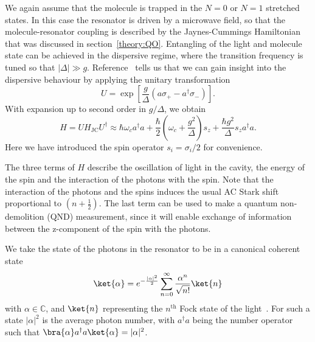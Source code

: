 We again assume that the molecule is trapped in the $N=0$ or $N=1$ stretched
states. In this case the resonator is driven by a microwave field, so that the
molecule-resonator coupling is described by the Jaynes-Cummings
Hamiltonian that was discussed in section~\ref{theory:QO}.
%
Entangling of the light and molecule state can be achieved in the dispersive
regime, where the transition frequency is tuned so that $|\Delta|\gg g$.
Reference~\cite{PhysRevA.69.062320} tells us that we can gain insight into the
dispersive behaviour by applying the unitary transformation
%
\begin{equation}
  U = \exp \left[\frac{g}{\Delta}(a\sigma_+ - a^\dagger\sigma_-)\right].
  \label{mws:eqn:Utransform}
\end{equation}
%
With expansion up to second order in $g/\Delta$, we obtain
%
\begin{equation} H= UH_\text{JC}U^\dagger \approx \hbar \omega_c
  a^\dagger a + \frac{\hbar}{2}\left(\omega_c +
  \frac{g^2}{\Delta}\right)s_z + \frac{\hbar
  g^2}{\Delta}s_z a^\dagger a.
  \label{mws:eqn:UHU}
\end{equation}
%
Here we have introduced the spin operator $s_i = \sigma_i/2$ for convenience.

The three terms of $H$ describe the oscillation of light in the cavity, the
energy of the spin and the interaction of the photons with the spin. Note that
the interaction of the photons and the spins induces the usual AC Stark shift
proportional to $(n+\frac{1}{2})$. The last term can be used to make a quantum
non-demolition (QND) measurement, since it will enable exchange of information
between the z-component of the spin with the photons.

We take the state of the photons in the resonator to be in a canonical coherent
state~\cite{Gazeau2009}
%
\begin{equation}
  \ket{\alpha} = e^{-\frac{|\alpha|^2}{2}}\sum_{n=0}^\infty \frac{\alpha^n}{\sqrt{n!}} \ket{n}
  \label{mws:eqn:coherent}
\end{equation}
%
with $\alpha\in\mathbb{C}$, and $\ket{n}$ representing the $n^\text{th}$
Fock state of the light~\cite{agarwal2012}. For such a state $|\alpha|^2$ is
the average photon number, with $a^\dagger a$ being the number operator such
that $\bra{\alpha}a^\dagger a \ket{\alpha} = |\alpha|^2$.

